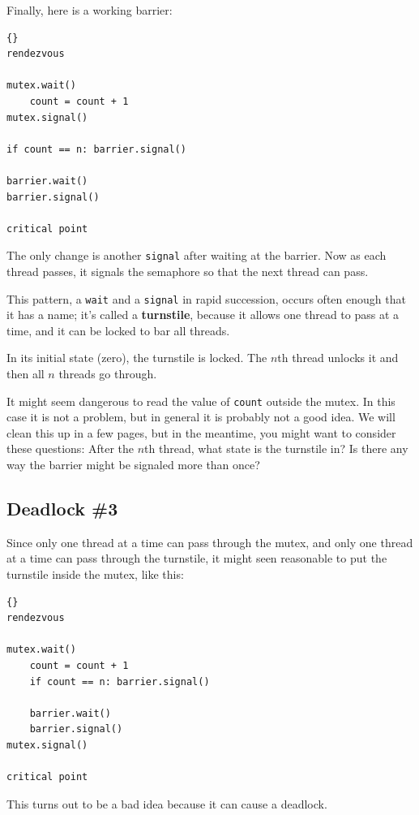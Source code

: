 \documentclass{book}
\begin{document}
Finally, here is a working barrier:

\begin{lstlisting}[title={Barrier solution}]{}
rendezvous

mutex.wait()
    count = count + 1
mutex.signal()

if count == n: barrier.signal()

barrier.wait()
barrier.signal()

critical point
\end{lstlisting}

The only change is another {\tt signal} after waiting
at the barrier.  Now as each thread passes, it signals the
semaphore so that the next thread can pass.

This pattern, a {\tt wait} and a {\tt signal} in rapid
succession, occurs often enough that it has a name;
it's called a {\bf turnstile}, because it allows one thread to pass
at a time, and it can be locked to bar all threads.

In its initial state (zero), the turnstile is locked.  The $n$th
thread unlocks it and then all $n$ threads go through.

It might seem dangerous to read the value of {\tt count} outside the
mutex.  In this case it is not a problem, but in general it is
probably not a good idea.  We will clean this up in a few pages, but
in the meantime, you might want to consider these questions: After the
$n$th thread, what state is the turnstile in?  Is there any way the
barrier might be signaled more than once?



\subsection {Deadlock \#3}

Since only one thread at a time can pass through the
mutex, and only one thread at a time can pass through
the turnstile, it might seen reasonable to put the
turnstile inside the mutex, like this:

\newpage
\begin{lstlisting}[title={Bad barrier solution}]{}
rendezvous

mutex.wait()
    count = count + 1
    if count == n: barrier.signal()

    barrier.wait()
    barrier.signal()
mutex.signal()

critical point
\end{lstlisting}

This turns out to be a bad idea because it can cause a
deadlock.
\end{document}
